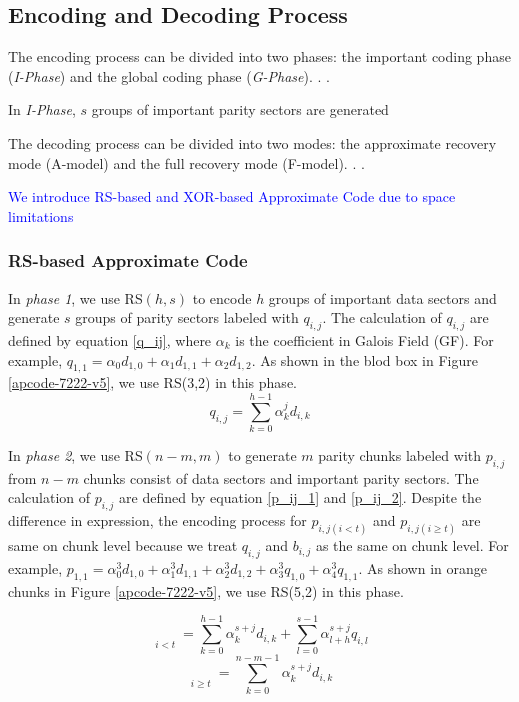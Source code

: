 \documentclass[sigconf]{acmart}
\begin{document}
\subsection{Encoding and Decoding Process}

The encoding process can be divided into two phases: the important coding phase (\emph{I-Phase}) and the global coding phase (\emph{G-Phase}). . .

In \emph{I-Phase}, $s$ groups of important parity sectors are generated

The decoding process can be divided into two modes: the approximate recovery mode (A-model) and the full recovery mode (F-model). . .


\textcolor{blue}{We introduce RS-based and XOR-based Approximate Code due to space limitations}
\subsubsection{RS-based Approximate Code}



In \emph{phase 1}, we use RS$(h,s)$ to encode $h$ groups of important data sectors and generate $s$ groups of parity sectors labeled with $q_{i,j}$. The calculation of $q_{i,j}$ are defined by equation \ref{q_ij}, where $\alpha_k$ is the coefficient in Galois Field (GF). 
For example, $q_{1,1} = \alpha_0 d_{1,0} + \alpha_1 d_{1,1} + \alpha_2 d_{1,2}$.
As shown in the blod box in Figure \ref{apcode-7222-v5}, we use RS(3,2) in this phase.
\begin{equation}\label{q_ij}
    q_{i,j} = \sum_{k=0}^{h-1} \alpha_k^{j} d_{i,k}
\end{equation}

In \emph{phase 2}, we use RS$(n-m,m)$ to generate $m$ parity chunks labeled with $p_{i,j}$ from $n-m$ chunks consist of data sectors and important parity sectors. The calculation of $p_{i,j}$ are defined by equation \ref{p_ij_1} and \ref{p_ij_2}.
Despite the difference in expression, the encoding process for $p_{i,j(i<t)}$ and $p_{i,j(i \geqslant t)}$ are same on chunk level because we treat $q_{i,j}$ and $b_{i,j}$ as the same on chunk level.
For example, $p_{1,1} = \alpha_0^3 d_{1,0} + \alpha_1^3 d_{1,1} + \alpha_2^3 d_{1,2} + \alpha_3^3 q_{1,0} + \alpha_4^3 q_{1,1}$.
As shown in orange chunks in Figure \ref{apcode-7222-v5}, we use RS(5,2) in this phase.

\begin{equation}\label{p_ij_1}
    \mathop{p_{i,j}}\limits_{i<t} = 
    \sum_{k=0}^{h-1} \alpha_k^{s+j} d_{i,k} +
    \sum_{l=0}^{s-1} \alpha_{l+h}^{s+j} q_{i,l}
\end{equation}
\begin{equation}\label{p_ij_2}
    \mathop{p_{i,j}}\limits_{i \geqslant t} = 
    \sum_{k=0}^{n-m-1} \alpha_k^{s+j} d_{i,k}
\end{equation}
\end{document}
